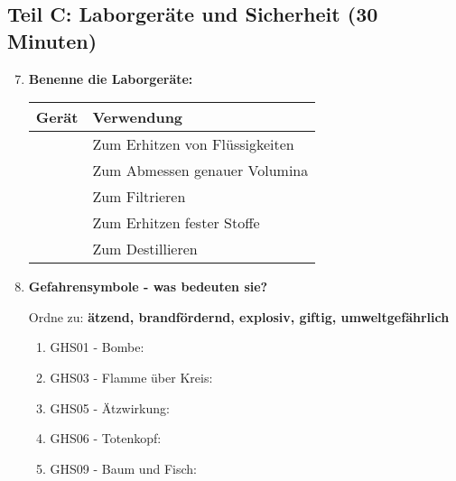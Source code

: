 \subsection*{Teil C: Laborgeräte und Sicherheit (30 Minuten)}

\begin{enumerate}[label=\arabic*.]
    \setcounter{enumi}{6}

    \item \textbf{Benenne die Laborgeräte:}
    \vspace{0.5cm}

    \begin{tabular}{|p{4cm}|p{10cm}|}
        \hline
        \textbf{Gerät} & \textbf{Verwendung} \\
        \hline
        \underline{\hspace{3cm}} & Zum Erhitzen von Flüssigkeiten \\
        \hline
        \underline{\hspace{3cm}} & Zum Abmessen genauer Volumina \\
        \hline
        \underline{\hspace{3cm}} & Zum Filtrieren \\
        \hline
        \underline{\hspace{3cm}} & Zum Erhitzen fester Stoffe \\
        \hline
        \underline{\hspace{3cm}} & Zum Destillieren \\
        \hline
    \end{tabular}

    \vspace{1cm}

    \item \textbf{Gefahrensymbole - was bedeuten sie?}
    \vspace{0.5cm}

    Ordne zu: \textbf{ätzend, brandfördernd, explosiv, giftig, umweltgefährlich}

    \begin{enumerate}[label=\alph*)]
        \item GHS01 - Bombe: \underline{\hspace{4cm}}
        \item GHS03 - Flamme über Kreis: \underline{\hspace{4cm}}
        \item GHS05 - Ätzwirkung: \underline{\hspace{4cm}}
        \item GHS06 - Totenkopf: \underline{\hspace{4cm}}
        \item GHS09 - Baum und Fisch: \underline{\hspace{4cm}}
    \end{enumerate}


\end{enumerate}
